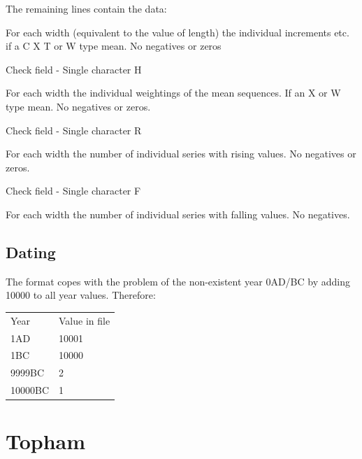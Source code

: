 \documentclass[10pt, headsepline,DIV14,BCOR0.5cm]{scrreprt}
\begin{document}
\begin{enumerate*}
\end{enumerate*}

The remaining lines contain the data:

\begin{itemize*}
 \item For each width (equivalent to the value of length) the individual increments etc. if a C X T or W type mean.  No negatives or zeros
 \item Check field - Single character H
 \item For each width the individual weightings of the mean sequences. If an X or W type mean.  No negatives or zeros.
 \item Check field - Single character R
 \item For each width the number of individual series with rising values.  No negatives or zeros.
 \item Check field - Single character F
 \item For each width the number of individual series with falling values. No negatives.
\end{itemize*}

\section{Dating}

The format copes with the problem of the non-existent year 0AD/BC by adding 10000 to all year values. Therefore: 

\begin{center}
\begin{tabular}{ll}
Year & Value in file\\
1AD & 10001\\
1BC & 10000\\
9999BC & 2\\
10000BC & 1
\end{tabular}
\end{center}




\chapter{Topham}
\end{document}
